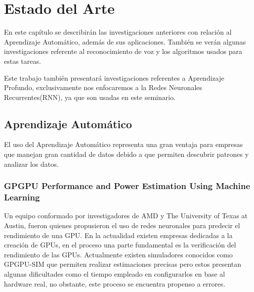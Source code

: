 \chapter{Estado del Arte}
En este capítulo se describirán las investigaciones anteriores con relación al Aprendizaje Automático, además de sus aplicaciones. También se verán algunas investigaciones referente al reconocimiento de voz y los algoritmos usados para estas tareas.

Este trabajo también presentará investigaciones referentes a Aprendizaje Profundo, exclusivamente nos enfocaremos a la Redes Neuronales Recurrentes(RNN), ya que son usadas en este seminario.




\section{Aprendizaje Automático}
El uso del Aprendizaje Automático representa una gran ventaja para empresas que manejan gran cantidad de datos debido a que permiten descubrir patrones y analizar los datos.

\subsection{GPGPU Performance and Power Estimation Using Machine Learning}
Un equipo conformado por investigadores\cite{GPU} de AMD y The University of Texas at Austin, fueron quienes propusieron el uso de redes neuronales para predecir el rendimiento de una GPU.
En la actualidad existen empresas dedicadas a la creación de GPUs, en el proceso una parte fundamental es la verificación del rendimiento de las GPUs. Actualmente existen simuladores conocidos como GPGPU-SIM que permiten realizar estimaciones precisas pero estos presentan algunas dificultades como el tiempo empleado en configurarlos en base al hardware real, no obstante, este proceso se encuentra propenso a errores. 
